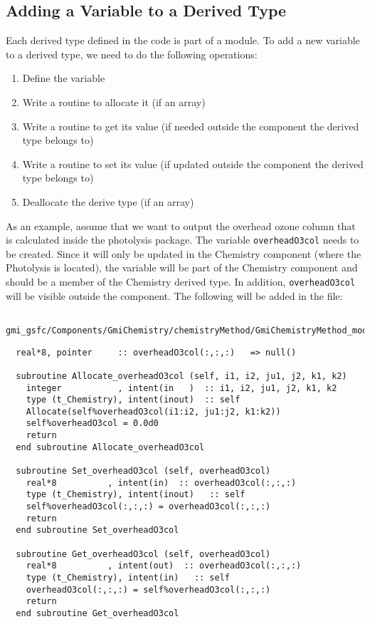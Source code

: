 \subsection{Adding a Variable to a Derived Type}
%
Each derived type defined in the code is part of a module.
To add a new variable to a derived type, we need to do the following
operations:
\begin{enumerate}
\item Define the variable
\item Write a routine to allocate it (if an array)
\item Write a routine to get its value (if needed outside the component the derived type belongs to)
\item Write a routine to set its value (if updated outside the component the derived type belongs to)
\item Deallocate the derive type (if an array)
\end{enumerate}
%
As an example, assume that we want to output the overhead ozone column that is calculated 
inside the photolysis package.
The variable {\tt overheadO3col} needs to be created.
Since it will only be updated in the Chemistry component (where the Photolysis is located),
the variable will be part of the Chemistry component and should be a member of the Chemistry
derived type.
In addition, {\tt overheadO3col} will be visible outside the component.
The following will be added in the file:
%
\begin{verbatim}
    gmi_gsfc/Components/GmiChemistry/chemistryMethod/GmiChemistryMethod_mod.F90
\end{verbatim}
%
\begin{verbatim}
  real*8, pointer     :: overheadO3col(:,:,:)   => null()

  subroutine Allocate_overheadO3col (self, i1, i2, ju1, j2, k1, k2)
    integer           , intent(in   )  :: i1, i2, ju1, j2, k1, k2
    type (t_Chemistry), intent(inout)  :: self
    Allocate(self%overheadO3col(i1:i2, ju1:j2, k1:k2))
    self%overheadO3col = 0.0d0
    return
  end subroutine Allocate_overheadO3col

  subroutine Set_overheadO3col (self, overheadO3col)
    real*8          , intent(in)  :: overheadO3col(:,:,:)
    type (t_Chemistry), intent(inout)   :: self
    self%overheadO3col(:,:,:) = overheadO3col(:,:,:)
    return
  end subroutine Set_overheadO3col

  subroutine Get_overheadO3col (self, overheadO3col)
    real*8          , intent(out)  :: overheadO3col(:,:,:)
    type (t_Chemistry), intent(in)   :: self
    overheadO3col(:,:,:) = self%overheadO3col(:,:,:)
    return
  end subroutine Get_overheadO3col
\end{verbatim}

